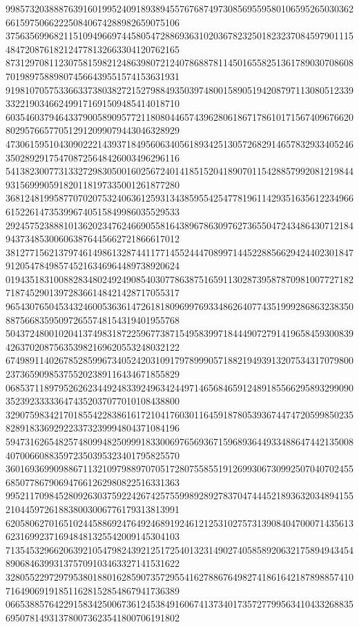 \begin{DoxyCode}
      998573203888763916019952409189389455767687497308569559580106595265030362661597506622250840674288982659075106
      375635699682115109496697445805472886936310203678232501823237084597901115484720876182124778132663304120762165
      873129708112307581598212486398072124078688781145016558251361789030708608701989758898074566439551574153631931
      919810705753366337380382721527988493503974800158905194208797113080512339332219034662499171691509485414018710
      603546037946433790058909577211808044657439628061867178610171567409676620802957665770512912099079443046328929
      473061595104309022214393718495606340561893425130572682914657832933405246350289291754708725648426003496296116
      541382300773133272983050016025672401418515204189070115428857992081219844931569990591820118197335001261877280
      368124819958770702075324063612593134385955425477819611429351635612234966615226147353996740515849986035529533
      292457523888101362023476246690558164389678630976273655047243486430712184943734853006063876445662721866617012
      381277156213797461498613287441177145524447089971445228856629424402301847912054784985745216346964489738920624
      019435183100882834802492490854030778638751659113028739587870981007727182718745290139728366148421428717055317
      965430765045343246005363614726181809699769334862640774351999286863238350887566835950972655748154319401955768
      504372480010204137498318722596773871549583997184449072791419658459300839426370208756353982169620553248032122
      674989114026785285996734052420310917978999057188219493913207534317079800237365909853755202389116434671855829
      068537118979526262344924833924963424497146568465912489185566295893299090352392333336474352037077010108438800
      329075983421701855422838616172104176030116459187805393674474720599850235828918336929223373239994804371084196
      594731626548257480994825099918330069765693671596893644933488647442135008407006608835972350395323401795825570
      360169369909886711321097988970705172807558551912699306730992507040702455685077867906947661262980822516331363
      995211709845280926303759224267425755998928927837047444521893632034894155210445972618838003006776179313813991
      620580627016510244588692476492468919246121253102757313908404700071435613623169923716948481325542009145304103
      713545329662063921054798243921251725401323149027405858920632175894943454890684639931375709103463327141531622
      328055229729795380188016285907357295541627886764982741861642187898857410716490691918511628152854867941736389
      066538857642291583425006736124538491606741373401735727799563410433268835695078149313780073623541800706191802

\end{DoxyCode}

